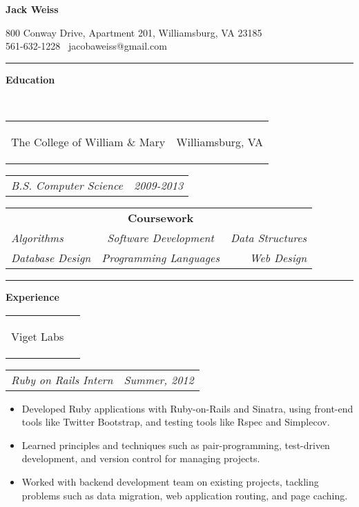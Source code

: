 \documentclass[11pt]{article}
\makeatletter
\newcommand{\headerrow}[2]
{\begin{tabular*}{\linewidth}{l@{\extracolsep{\fill}}r}
	#1 &
	#2 \\
\end{tabular*}}
\makeatother
\begin{document}
\begin{center}
	\begin{huge}
		\bf Jack Weiss
	\end{huge}

	800 Conway Drive, Apartment 201, Williamsburg, VA 23185 \\
	561-632-1228 \textbullet\ jacobaweiss@gmail.com
\end{center}
\hrule
\vspace{0.5em}

\begin{LARGE}
	\bf Education
\end{LARGE} 
\vspace{0.5em} \\
\headerrow
	{\begin{Large}The College of William \& Mary\end{Large}}
	{Williamsburg, VA}
\headerrow
	{\textit{B.S. Computer Science}}
	{\textit{2009-2013}}
\vspace{-1.5em}
\begin{center}
	\begin{tabular}{lcr}
		& {\bf Coursework}  & \\
		\textit{Algorithms} & \textit{Software Development} & \textit{Data Structures} \\
		\textit{Database Design} & \textit{Programming Languages} & \textit{Web Design}
		
	\end{tabular}
\end{center}
\hrule
\vspace{0.5em}

\begin{LARGE}
	\bf Experience
\end{LARGE} 
\vspace{0.5em}

	\headerrow
		{\begin{Large}Viget Labs\end{Large}}
		{}
	\headerrow
		{\textit{Ruby on Rails Intern}}
		{\textit{Summer, 2012}}
	\begin{itemize}
		\item Developed Ruby applications with Ruby-on-Rails and Sinatra, using front-end tools like Twitter Bootstrap, and testing tools like Rspec and Simplecov.
		\vspace{-0.8em}
		\item Learned principles and techniques such as pair-programming, test-driven development, and version control for managing projects.
		\vspace{-0.8em}
		\item Worked with backend development team on existing projects, tackling problems such as data migration, web application routing, and page caching.
	\end{itemize}
	
\end{document}
